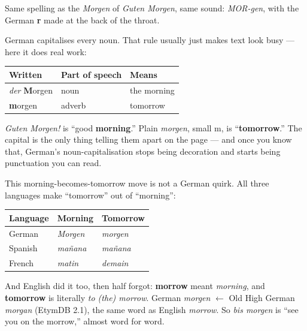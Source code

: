 Same spelling as the \emph{Morgen} of \emph{Guten Morgen}, same sound: \emph{MOR-gen}, with the German \textbf{r} made at the back of the throat.

\begin{grammarlens}[title={Grammar Lens: the capital letter splits the sense}]
German capitalises every noun. That rule usually just makes text look busy — here it does real work:

\noindent
\begin{tabularx}{\linewidth}{@{}>{\raggedright\arraybackslash}X>{\raggedright\arraybackslash}X>{\raggedright\arraybackslash}X@{}}
\toprule
\textbf{Written} & \textbf{Part of speech} & \textbf{Means} \\
\midrule
\emph{der} \textbf{M}orgen & noun & the morning \\
\textbf{m}orgen & adverb & tomorrow \\
\bottomrule
\end{tabularx}

\emph{Guten Morgen!} is \textquotedblleft{}good \textbf{morning}.\textquotedblright{} Plain \emph{morgen}, small m, is \textquotedblleft{}\textbf{tomorrow}.\textquotedblright{} The capital is the only thing telling them apart on the page — and once you know that, German's noun-capitalisation stops being decoration and starts being punctuation you can read.
\end{grammarlens}

\begin{cousinweb}
This morning-becomes-tomorrow move is not a German quirk. All three languages make \textquotedblleft{}tomorrow\textquotedblright{} out of \textquotedblleft{}morning\textquotedblright{}:

\noindent
\begin{tabularx}{\linewidth}{@{}>{\raggedright\arraybackslash}X>{\raggedright\arraybackslash}X>{\raggedright\arraybackslash}X@{}}
\toprule
\textbf{Language} & \textbf{Morning} & \textbf{Tomorrow} \\
\midrule
German & \emph{Morgen} & \emph{morgen} \\
Spanish & \emph{mañana} & \emph{mañana} \\
French & \emph{matin} & \emph{demain} \\
\bottomrule
\end{tabularx}

And English did it too, then half forgot: \textbf{morrow} meant \emph{morning}, and \textbf{tomorrow} is literally \emph{to (the) morrow}. German \emph{morgen} $\leftarrow$ Old High German \emph{morgan} (EtymDB 2.1), the same word as English \emph{morrow}. So \emph{bis morgen} is \textquotedblleft{}see you on the morrow,\textquotedblright{} almost word for word.
\end{cousinweb}

